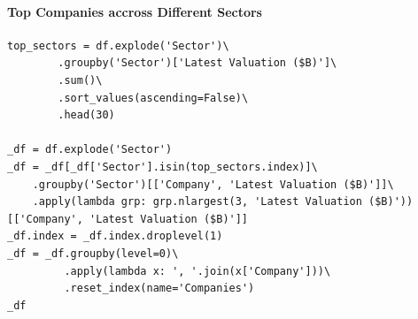 \documentclass[a4paper,12pt]{article}
\begin{document}
\newpage
\paragraph{Top Companies accross Different Sectors}
\label{sec:org20b0bad}

\begin{verbatim}
top_sectors = df.explode('Sector')\
        .groupby('Sector')['Latest Valuation ($B)']\
        .sum()\
        .sort_values(ascending=False)\
        .head(30)

_df = df.explode('Sector')
_df = _df[_df['Sector'].isin(top_sectors.index)]\
    .groupby('Sector')[['Company', 'Latest Valuation ($B)']]\
    .apply(lambda grp: grp.nlargest(3, 'Latest Valuation ($B)'))[['Company', 'Latest Valuation ($B)']]
_df.index = _df.index.droplevel(1)
_df = _df.groupby(level=0)\
         .apply(lambda x: ', '.join(x['Company']))\
         .reset_index(name='Companies')
_df
\end{verbatim}
\end{document}
